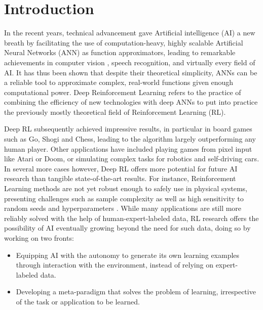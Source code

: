 \section{Introduction}

In the recent years, technical advancement gave Artificial intelligence (AI) a new breath by facilitating the use of computation-heavy, highly scalable Artificial Neural Networks (ANN) as function approximators, leading to remarkable achievements in computer vision \cite{krizhevsky2012imagenet}, speech recognition\cite{dahl2011context}, and virtually every field of AI. It has thus been shown that despite their theoretical simplicity, ANNs can be a reliable tool to approximate complex, real-world functions given enough computational power. Deep Reinforcement Learning refers to the practice of combining the efficiency of new technologies with deep ANNs to put into practice the previously mostly theoretical field of Reinforcement Learning (RL). 

Deep RL subsequently achieved impressive results, in particular in board games such as Go, Shogi and Chess\cite{silver2018general}, leading to the algorithm largely outperforming any human player. Other applications have included playing games from pixel input like Atari\cite{mnih2015human} or Doom\cite{kempka2016vizdoom}, or simulating complex tasks for robotics\cite{levine2016end} and self-driving cars\cite{pan2017virtual}. In several more cases however, Deep RL offers more potential for future AI research than tangible state-of-the-art results. For instance, Reinforcement Learning methods are not yet robust enough to safely use in physical systems, presenting challenges such as sample complexity as well as high sensitivity to random seeds and hyperparameters\cite{henderson2018deep} \cite{engstrom2020implementation} \cite{dossa2021empirical}.
While many applications are still more reliably solved with the help of human-expert-labeled data,  RL research offers the possibility of AI eventually growing beyond the need for such data, doing so by working on two fronts:
\begin{itemize}
\item Equipping AI with the autonomy to generate its own learning examples through interaction with the environment, instead of relying on expert-labeled data.
\item Developing a meta-paradigm that solves the problem of learning, irrespective of the task or application to be learned.
\end{itemize}

